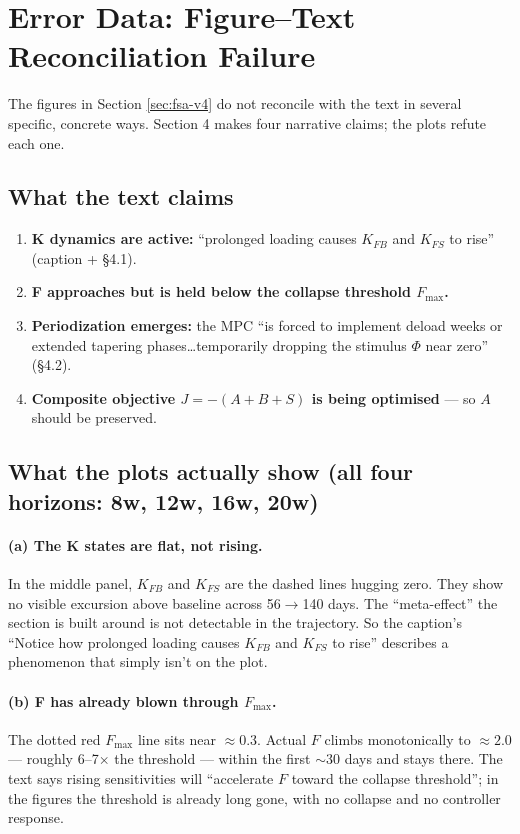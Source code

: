 \section{Error Data: Figure--Text Reconciliation Failure} \label{sec:error_data}

The figures in Section \ref{sec:fsa-v4} do not reconcile with the text in several specific, concrete ways. Section 4 makes four narrative claims; the plots refute each one.

\subsection{What the text claims}

\begin{enumerate}
    \item \textbf{K dynamics are active:} ``prolonged loading causes $K_{FB}$ and $K_{FS}$ to rise'' (caption + \S4.1).
    \item \textbf{F approaches but is held below the collapse threshold $F_{\max}$.}
    \item \textbf{Periodization emerges:} the MPC ``is forced to implement deload weeks or extended tapering phases\ldots temporarily dropping the stimulus $\Phi$ near zero'' (\S4.2).
    \item \textbf{Composite objective $J = -(A+B+S)$ is being optimised} --- so $A$ should be preserved.
\end{enumerate}

\subsection{What the plots actually show (all four horizons: 8w, 12w, 16w, 20w)}

\paragraph{(a) The K states are flat, not rising.}
In the middle panel, $K_{FB}$ and $K_{FS}$ are the dashed lines hugging zero. They show no visible excursion above baseline across 56$\rightarrow$140 days. The ``meta-effect'' the section is built around is not detectable in the trajectory. So the caption's ``Notice how prolonged loading causes $K_{FB}$ and $K_{FS}$ to rise'' describes a phenomenon that simply isn't on the plot.

\paragraph{(b) F has already blown through $F_{\max}$.}
The dotted red $F_{\max}$ line sits near $\approx 0.3$. Actual $F$ climbs monotonically to $\approx 2.0$ --- roughly 6--7$\times$ the threshold --- within the first $\sim$30 days and stays there. The text says rising sensitivities will ``accelerate $F$ toward the collapse threshold''; in the figures the threshold is already long gone, with no collapse and no controller response.

